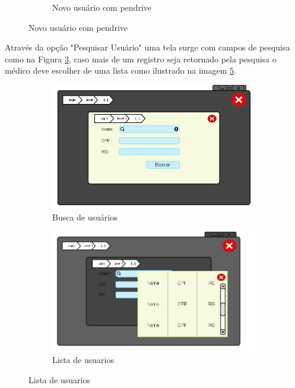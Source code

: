 \documentclass[12pt]{article}
\begin{document}
\begin{figure}[h]
\begin{subfigure}{0.5\textwidth}
\caption{Novo usuário com pendrive}
\label{menu_com_pendrive2}
\end{subfigure}
\end{figure}
\newpage
Através da opção "Pesquisar Usuário" uma tela surge com campos de pesquisa como na Figura \ref{busca_usuario}, caso mais de um registro seja retornado pela pesquisa o médico deve escolher de uma lista como ilustrado na imagem \ref{busca_usuario1}.

\begin{figure}[h]
\begin{subfigure}{0.5\textwidth}
\includegraphics[scale=0.3]{imagens/1-1Buscar_Usuario.jpg}
\caption{Busca de usuários}
\label{busca_usuario}
\end{subfigure}
\begin{subfigure}{0.5\textwidth}
\includegraphics[scale=0.3]{imagens/1-1Multiplos_Resultados.jpg} 
\caption{Lista de usuarios}
\label{busca_usuario1}
\end{subfigure}
\end{figure}
\end{document}
